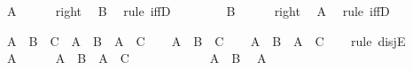 \begin{isabellebody}
\ {\isachardoublequoteopen}A{\isachardoublequoteclose}\isanewline
\ \ \ \ \isamarkupfalse%
\ right\ \isamarkupfalse%
\ {\isachardoublequoteopen}B{\isachardoublequoteclose}\ \isamarkupfalse%
\ {\isacharparenleft}rule\ iffD{}{\isacharparenright}\isanewline
\ \ \isamarkupfalse%
\isanewline
\ \ \ \ \isamarkupfalse%
\ {\isachardoublequoteopen}B{\isachardoublequoteclose}\isanewline
\ \ \ \ \isamarkupfalse%
\ right\ \isamarkupfalse%
\ {\isachardoublequoteopen}A{\isachardoublequoteclose}\ \isamarkupfalse%
\ {\isacharparenleft}rule\ iffD{}{\isacharparenright}\isanewline
\ \ \isamarkupfalse%
\isanewline
{}\isamarkupfalse%
%
\endisatagproof
{\isafoldproof}%
%
\isadelimproof
%
\endisadelimproof
%
\begin{isamarkuptext}%
\begin{Answer}[ref = disjEexercises] \end{Answer}%
\end{isamarkuptext}\isamarkuptrue%
\isamarkupfalse%
\ {\isachardoublequoteopen}A\ {\isasymor}\ B\ {\isasymand}\ C\ {\isasymlongrightarrow}\ {\isacharparenleft}A\ {\isasymor}\ B{\isacharparenright}\ {\isasymand}\ {\isacharparenleft}A\ {\isasymor}\ C{\isacharparenright}{\isachardoublequoteclose}\isanewline
%
\isadelimproof
%
\endisadelimproof
%
\isatagproof
{}\isamarkupfalse%
\isanewline
\ \ \isamarkupfalse%
\ {\isachardoublequoteopen}A\ {\isasymor}\ B\ {\isasymand}\ C{\isachardoublequoteclose}\isanewline
\ \ \isamarkupfalse%
\ {\isachardoublequoteopen}{\isacharparenleft}A\ {\isasymor}\ B{\isacharparenright}\ {\isasymand}\ {\isacharparenleft}A\ {\isasymor}\ C{\isacharparenright}{\isachardoublequoteclose}\isanewline
\ \ \isamarkupfalse%
\ {\isacharparenleft}rule\ disjE{\isacharparenright}\isanewline
\ \ \ \ \isamarkupfalse%
\ {\isachardoublequoteopen}A{\isachardoublequoteclose}\isanewline
\ \ \ \ \isamarkupfalse%
\ {\isachardoublequoteopen}{\isacharparenleft}A\ {\isasymor}\ B{\isacharparenright}\ {\isasymand}\ {\isacharparenleft}A\ {\isasymor}\ C{\isacharparenright}{\isachardoublequoteclose}\isanewline
\ \ \ \ \isamarkupfalse%
\isanewline
\ \ \ \ \ \ \isamarkupfalse%
\ {\isachardoublequoteopen}A\ {\isasymor}\ B{\isachardoublequoteclose}\ \isamarkupfalse%
\ {\isacharbackquoteopen}A{\isacharbackquoteclose}\isacommand{{\isachardot}{\isachardot}}\isamarkupfalse%

\end{isabellebody}
